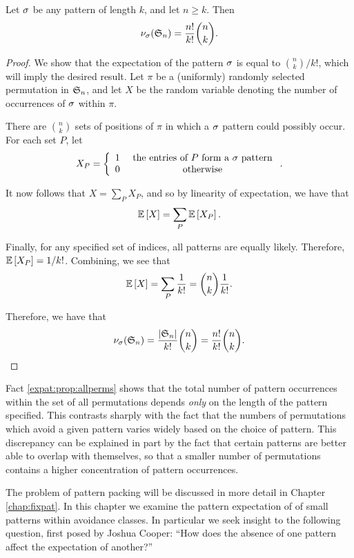     \begin{proposition} \label{expat:prop:allperms}
      Let $\sg$ be any pattern of length $k$, and let $n \geq k$.  Then 
      $$ \num_\sg(\S_n) = \frac{n!}{k!} \binom{n}{k}.$$
    \end{proposition}
    \begin{proof}
      We show that the expectation of the pattern $\sg$ is equal to 
      $\binom{n}{k}/k!$, which will imply the desired result. 
      Let $\pi$ be a (uniformly) randomly selected permutation in $\S_n$, and let
      $X$ be the random variable denoting the number of occurrences of $\sg$
      within $\pi$. 

      There are $\binom{n}{k}$ sets of positions of $\pi$ in which a $\sg$
      pattern could possibly occur. For each set $P$, let 
      $$ X_P = \left\{ \begin{array}{cc} 
                1 & \text{ the entries of $P$ form a $\sg$ pattern} \\
                0 & \text{ otherwise} 
              \end{array}\right..
      $$

      It now follows that $X = \sum_{P} X_P$, and so by linearity of expectation,
      we have that 
      $$ \Ex{X} = \sum_P \Ex{X_P}.$$

      Finally, for any specified set of indices, all patterns are equally likely.
      Therefore, $\Ex{X_P} = 1 / k!$. Combining, we see that 
      $$ \Ex{X} = \sum_P \frac{1}{k!} = \binom{n}{k}\frac{1}{k!}. $$

      Therefore, we have that 
      $$\num_\sg(\S_n) = \frac{|\S_n|}{k!} \binom{n}{k} =
      \frac{n!}{k!} \binom{n}{k}.$$
    \end{proof}


    Fact \ref{expat:prop:allperms} shows that the total number of pattern occurrences
    within the set of all permutations depends \emph{only} on the length of the
    pattern specified. This contrasts sharply with the fact that the numbers of
    permutations which avoid a given pattern varies widely based on the choice of
    pattern. This discrepancy can be explained in part by the fact that certain
    patterns are better able to overlap with themselves, so that a smaller number
    of permutations contains a higher concentration of pattern occurrences. 
    
    The problem of pattern packing will be discussed in more detail in Chapter
    \ref{chap:fixpat}. In this chapter we examine the pattern expectation of
    of small patterns within avoidance classes. In particular we seek insight to
    the following question, first posed by Joshua Cooper: ``How does the absence
    of one pattern affect the expectation of another?''



